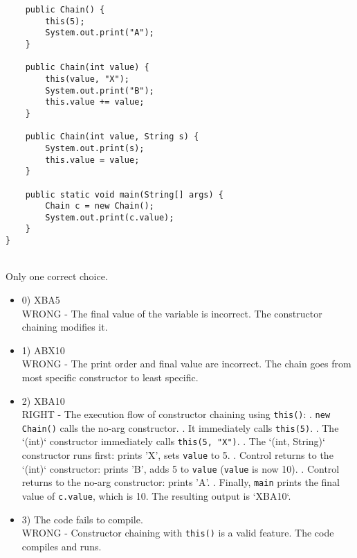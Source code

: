\documentclass[12pt]{article}
\begin{document}
\begin{enumerate}[label=(\arabic*)]
\begin{verbatim}
    public Chain() {
        this(5);
        System.out.print("A");
    }

    public Chain(int value) {
        this(value, "X");
        System.out.print("B");
        this.value += value;
    }

    public Chain(int value, String s) {
        System.out.print(s);
        this.value = value;
    }

    public static void main(String[] args) {
        Chain c = new Chain();
        System.out.print(c.value);
    }
}
\end{verbatim}
\\ \noindent Only one correct choice. 
\begin{itemize}
\item 0) XBA5
 \\ 
WRONG - The final value of the variable is incorrect. The constructor chaining modifies it.

\item 1) ABX10
 \\ 
WRONG - The print order and final value are incorrect. The chain goes from most specific constructor to least specific.

\item 2) XBA10
 \\ 
RIGHT - The execution flow of constructor chaining using \verb|this()|: . \verb|new Chain()| calls the no-arg constructor. . It immediately calls \verb|this(5)|. . The `(int)` constructor immediately calls \verb|this(5, "X")|. . The `(int, String)` constructor runs first: prints 'X', sets \verb|value| to 5. . Control returns to the `(int)` constructor: prints 'B', adds 5 to \verb|value| (\verb|value| is now 10). . Control returns to the no-arg constructor: prints 'A'. . Finally, \verb|main| prints the final value of \verb|c.value|, which is 10. \newline The resulting output is `XBA10`.

\item 3) The code fails to compile.
 \\ 
WRONG - Constructor chaining with \verb|this()| is a valid feature. The code compiles and runs.


\end{itemize}
\end{enumerate}
\end{document}
